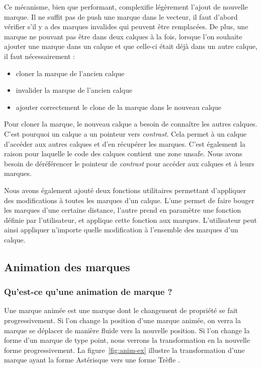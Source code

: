 \documentclass[12pt]{article}
\begin{document}
Ce mécanisme, bien que performant, complexifie légèrement l'ajout de nouvelle marque. Il ne suffit pas de
push une marque dans le vecteur, il faut d'abord vérifier s'il y a des marques invalides qui peuvent être
remplacées. 
De plus, une marque ne pouvant pas être dans deux calques à la fois, lorsque l'on souhaite ajouter une 
marque dans un calque et que celle-ci était déjà dans un autre calque, il faut nécessairement :
\begin{itemize}
\item cloner la marque de l'ancien calque
\item invalider la marque de l'ancien calque
\item ajouter correctement le clone de la marque dans le nouveau calque
\end{itemize}
Pour cloner la marque, le nouveau calque a besoin de connaître les autres calques. C'est pourquoi un 
calque a un pointeur vers \textit{contrast}. Cela permet à un calque d'accéder aux autres calques et d'en 
récupérer les  marques. C'est également la raison pour laquelle le code des calques contient une zone 
\gls{unsafe}. Nous avons besoin de déréférencer le pointeur de \textit{contrast} pour accéder aux calques et à 
leurs marques.

Nous avons également ajouté deux fonctions utilitaires permettant d'appliquer des modifications à toutes
les marques d'un calque. L'une permet de faire bouger les marques d'une certaine distance, l'autre prend 
en paramètre une fonction définie par l'utilisateur, et applique cette fonction aux marques. L'utilisateur
peut ainsi appliquer n'importe quelle modification à l'ensemble des marques d'un calque.

\subsection{Animation des marques}
\subsubsection{Qu'est-ce qu'une animation de marque ?}

Une marque animée est une marque dont le changement de propriété se fait progressivement.
Si l'on change la position d'une marque animée, on verra la marque se déplacer de manière fluide vers la
nouvelle position. Si l'on change la forme d'un marque de type point, nous verrons la transformation en la nouvelle forme progressivement.
La figure~\ref{fig:anim-ex} illustre la transformation d'une marque ayant la forme \og Astérisque \fg vers une 
forme \og Trèfle \fg.
\end{document}
